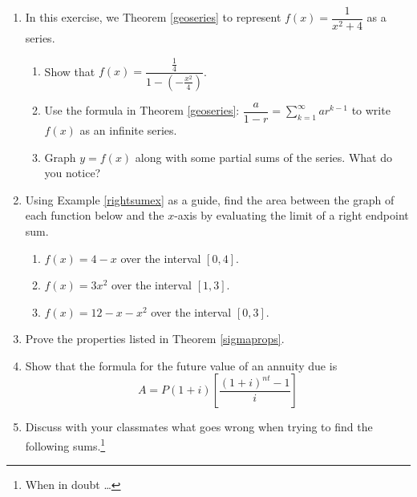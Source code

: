 \begin{enumerate}
\setcounter{enumi}{\value{HW}}

\item\label{seriesforfunctionex}  In this exercise,  we  Theorem \ref{geoseries}  to represent  $f(x) = \dfrac{1}{x^2+4}$ as a series.

\begin{enumerate}

\item  Show that $f(x) = \dfrac{\frac{1}{4}}{1 - \left( -\frac{x^2}{4} \right)}$.

\item  Use the formula  in Theorem \ref{geoseries}: $\dfrac{a}{1-r} = \displaystyle{\sum_{k=1}^{\infty} ar^{k-1}}$ to write $f(x)$ as an infinite series.

\item Graph $y = f(x)$ along with some partial sums of the series.  What do you notice?


\end{enumerate}



\item  Using Example \ref{rightsumex} as a guide, find the area between the graph of each function below and the $x$-axis by evaluating the limit of a right endpoint sum.



\begin{enumerate}

\item  $f(x) = 4-x$ over the interval $[0,4]$.   %

\item  $f(x) = 3x^2$ over the interval $[1,3]$.    %

\item  $f(x) = 12-x-x^2$ over the interval $[0,3]$.   %


\end{enumerate}




\item Prove the properties listed in Theorem \ref{sigmaprops}.

\item Show that the formula for the future value of an annuity due is \[A = P(1 + i)\left[\frac{(1 + i)^{nt} - 1}{i}\right]\]


\newpage

\item  Discuss with your classmates what goes wrong when trying to find the following sums.\footnote{When in doubt \ldots }



\end{enumerate}
